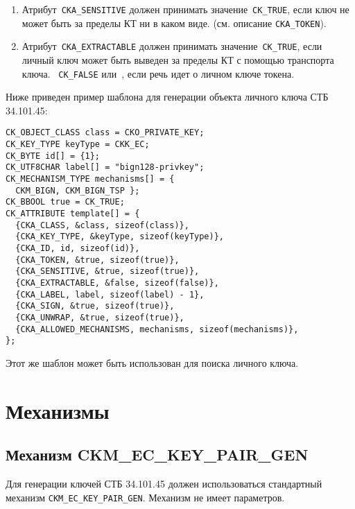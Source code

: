 \begin{enumerate}
\item
Атрибут~\verb|CKA_SENSITIVE| должен принимать значение~\verb|CK_TRUE|,
если ключ не может быть  за пределы КТ ни в каком виде.
%
 (см. описание \verb|CKA_TOKEN|). 

\item
Атрибут~\verb|CKA_EXTRACTABLE| должен принимать значение~\verb|CK_TRUE|,
если личный ключ может быть выведен за пределы КТ с помощью транспорта 
ключа. 
%
~\verb|CK_FALSE| 
или~, если речь идет о личном ключе токена.
\end{enumerate}

Ниже приведен пример шаблона для генерации объекта личного ключа СТБ 34.101.45:
\begin{verbatim}
CK_OBJECT_CLASS class = CKO_PRIVATE_KEY;
CK_KEY_TYPE keyType = CKK_EC;
CK_BYTE id[] = {1};
CK_UTF8CHAR label[] = "bign128-privkey";
CK_MECHANISM_TYPE mechanisms[] = {
  CKM_BIGN, CKM_BIGN_TSP };
CK_BBOOL true = CK_TRUE;
CK_ATTRIBUTE template[] = {
  {CKA_CLASS, &class, sizeof(class)},
  {CKA_KEY_TYPE, &keyType, sizeof(keyType)},
  {CKA_ID, id, sizeof(id)},
  {CKA_TOKEN, &true, sizeof(true)},
  {CKA_SENSITIVE, &true, sizeof(true)},
  {CKA_EXTRACTABLE, &false, sizeof(false)},
  {CKA_LABEL, label, sizeof(label) - 1},
  {CKA_SIGN, &true, sizeof(true)},
  {CKA_UNWRAP, &true, sizeof(true)},
  {CKA_ALLOWED_MECHANISMS, mechanisms, sizeof(mechanisms)},
};
\end{verbatim}

Этот же шаблон может быть использован для поиска личного ключа.

\section{Механизмы}
                                                                                                                 
\subsection{Механизм CKM\_EC\_KEY\_PAIR\_GEN}\label{CRYPTOKI.Gen}


Для генерации ключей СТБ 34.101.45 должен использоваться стандартный 
механизм \verb|CKM_EC_KEY_PAIR_GEN|. Механизм не имеет параметров. 

